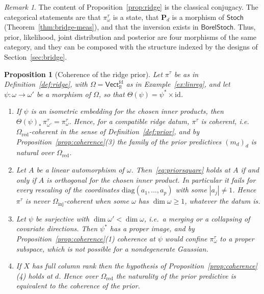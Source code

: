 \documentclass[11pt,a4paper]{article}
\theoremstyle{plain}
\newtheorem{proposition}[theorem]{Proposition}
\theoremstyle{definition}
\theoremstyle{remark}
\newtheorem{remark}[theorem]{Remark}
\newcommand{\cat}[1]{\mathsf{#1}}
\newcommand{\catO}{\cat{\Omega}}
\newcommand{\Stoch}{\cat{Stoch}}
\newcommand{\id}{\mathrm{id}}
\newcommand{\R}{\mathbb{R}}
\newcommand{\Vect}{\cat{Vect}}
\newcommand{\BorelStoch}{\cat{BorelStoch}}
\begin{document}
\begin{remark}\label{rem:ridge}
The content of Proposition~\ref{prop:ridge} is the classical conjugacy. The
categorical statements are that $\pi^{\tau}_{\omega}$ is a state, that
$\mathbf{P}_{d}$ is a morphism of $\Stoch$ (Theorem~\ref{thm:bridge-meas}), and
that the inversion exists in $\BorelStoch$. Thus, prior, likelihood, joint
distribution and posterior are four morphisms of the same category, and they
can be composed with the structure indexed by the designs of
Section~\ref{sec:bridge}.
\end{remark}

\begin{proposition}[Coherence of the ridge prior]\label{prop:ridgecoherence}
Let $\pi^{\tau}$ be as in Definition~\ref{def:ridge}, with
$\catO = \Vect^{\mathrm{fd}}_{\R}$ as in Example~\ref{ex:linreg}, and let
$\psi \colon \omega \to \omega'$ be a morphism of $\catO$, so that
$\Theta(\psi) = \psi^{*}\times\id$.
\begin{enumerate}
\item If $\psi$ is an isometric embedding for the chosen inner products, then
$\Theta(\psi)_{*}\,\pi^{\tau}_{\omega'} = \pi^{\tau}_{\omega}$. Hence, for a
compatible ridge datum, $\pi^{\tau}$ is coherent, i.e.\
$\catO_{\mathrm{red}}$-coherent in the sense of Definition~\ref{def:prior},
and by Proposition~\ref{prop:coherence}(3) the family of the prior predictives
$(m_{d})_{d}$ is natural over $\catO_{\mathrm{red}}$.
\item Let $A$ be a linear automorphism of $\omega$.
Then~\eqref{eq:priorsquare} holds at $A$ if and only if $A$ is orthogonal for
the chosen inner product. In particular it fails for every rescaling of the
coordinates $\mathrm{diag}(a_{1},\dots,a_{p})$ with some $|a_{j}| \neq 1$.
Hence $\pi^{\tau}$ is never $\catO_{\mathrm{inj}}$-coherent when some $\omega$
has $\dim\omega \ge 1$, whatever the datum is.
\item Let $\psi$ be surjective with $\dim\omega' < \dim\omega$, i.e.\ a merging
or a collapsing of covariate directions. Then $\psi^{*}$ has a proper image,
and by Proposition~\ref{prop:coherence}(1) coherence at $\psi$ would confine
$\pi^{\tau}_{\omega}$ to a proper subspace, which is not possible for a
nondegenerate Gaussian.
\item If $X$ has full column rank then the hypothesis of
Proposition~\ref{prop:coherence}(4) holds at $d$. Hence over
$\catO_{\mathrm{red}}$ the naturality of the prior predictive is equivalent to
the coherence of the prior.
\end{enumerate}
\end{proposition}
\end{document}
